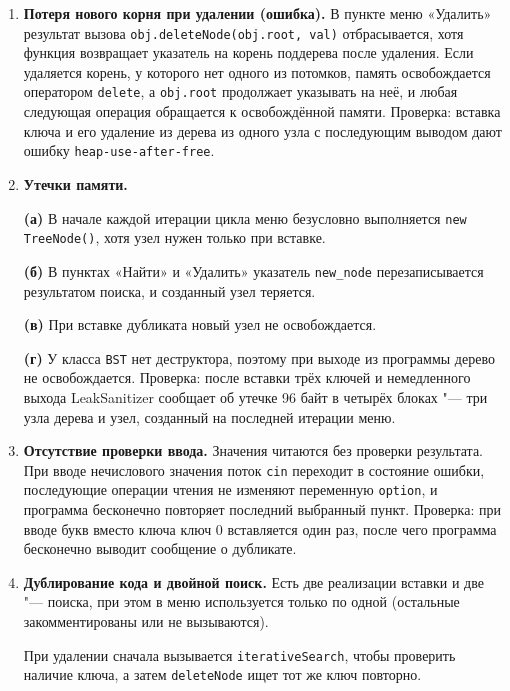 \documentclass[otchet]{SCWorks}
\begin{document}
\begin{enumerate}
  \item \textbf{Потеря нового корня при удалении (ошибка).} В пункте меню
        «Удалить» результат вызова \texttt{obj.deleteNode(obj.root, val)}
        отбрасывается, хотя функция возвращает указатель на корень поддерева
        после удаления. Если удаляется корень, у которого нет одного из
        потомков, память освобождается оператором \texttt{delete}, а
        \texttt{obj.root} продолжает указывать на неё, и любая следующая
        операция обращается к освобождённой памяти. Проверка: вставка
        ключа и его удаление из дерева из одного узла с последующим выводом
        дают ошибку \texttt{heap-use-after-free}.

  \item \textbf{Утечки памяти.} 
  
  	\textbf{(а)} В начале каждой итерации цикла меню безусловно выполняется \texttt{new TreeNode()}, 
		хотя узел нужен только при вставке. 
		
		\textbf{(б)} В пунктах «Найти» и «Удалить» указатель \texttt{new\_node} перезаписывается результатом 
		поиска, и созданный узел теряется. 
		
		\textbf{(в)} При вставке дубликата новый узел не освобождается. 
		
		\textbf{(г)} У класса \texttt{BST} нет деструктора, поэтому
        при выходе из программы дерево не освобождается. Проверка: после
        вставки трёх ключей и немедленного выхода LeakSanitizer сообщает об
        утечке 96 байт в четырёх блоках "--- три узла дерева и узел,
        созданный на последней итерации меню.

  \item \textbf{Отсутствие проверки ввода.} Значения читаются без проверки
        результата. При вводе нечислового значения поток \texttt{cin}
        переходит в состояние ошибки, последующие операции чтения не
        изменяют переменную \texttt{option}, и программа бесконечно
        повторяет последний выбранный пункт. Проверка: при вводе букв
        вместо ключа ключ 0 вставляется один раз, после чего программа
        бесконечно выводит сообщение о дубликате.

  \item \textbf{Дублирование кода и двойной поиск.} Есть две реализации
        вставки и две "--- поиска, при этом в меню используется только по
        одной (остальные закомментированы или не вызываются). 
		
		При удалении сначала вызывается \texttt{iterativeSearch}, чтобы проверить
        наличие ключа, а затем \texttt{deleteNode} ищет тот же ключ повторно.


\end{enumerate}
\end{document}
